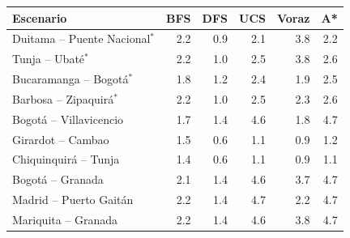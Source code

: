 \begin{tabular}{lrrrrr}
\toprule
\textbf{Escenario} & \textbf{BFS} & \textbf{DFS} & \textbf{UCS} & \textbf{Voraz} & \textbf{A*} \\
\midrule
Duitama -- Puente Nacional$^{*}$ & 2.2 & 0.9 & 2.1 & 3.8 & 2.2 \\
Tunja -- Ubaté$^{*}$ & 2.2 & 1.0 & 2.5 & 3.8 & 2.6 \\
Bucaramanga -- Bogotá$^{*}$ & 1.8 & 1.2 & 2.4 & 1.9 & 2.5 \\
Barbosa -- Zipaquirá$^{*}$ & 2.2 & 1.0 & 2.5 & 2.3 & 2.6 \\
Bogotá -- Villavicencio & 1.7 & 1.4 & 4.6 & 1.8 & 4.7 \\
Girardot -- Cambao & 1.5 & 0.6 & 1.1 & 0.9 & 1.2 \\
Chiquinquirá -- Tunja & 1.4 & 0.6 & 1.1 & 0.9 & 1.1 \\
Bogotá -- Granada & 2.1 & 1.4 & 4.6 & 3.7 & 4.7 \\
Madrid -- Puerto Gaitán & 2.2 & 1.4 & 4.7 & 2.2 & 4.7 \\
Mariquita -- Granada & 2.2 & 1.4 & 4.6 & 3.8 & 4.7 \\
\bottomrule
\end{tabular}
